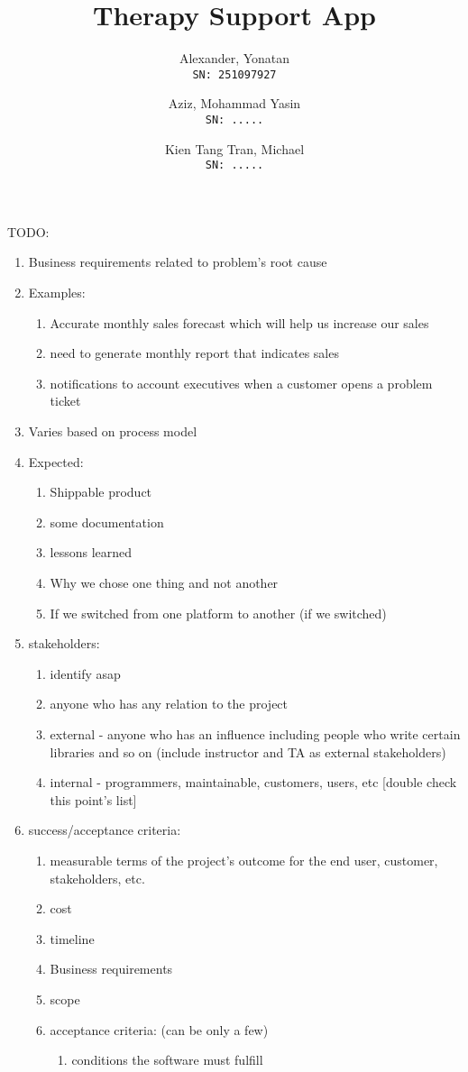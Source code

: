 \documentclass[11pt]{article}
\author{Alexander, Yonatan\\
\texttt{SN: 251097927}
\and
Aziz, Mohammad Yasin\\
\texttt{SN: .....}
\and
Kien Tang Tran, Michael\\
\texttt{SN: .....}
}
\title{Therapy Support App}
\begin{document}
    TODO:

    \begin{enumerate}
        \item Business requirements related to problem's root cause
        \item Examples:
        \begin{enumerate}
            \item Accurate monthly sales forecast which will help us increase our sales
            \item need to generate monthly report that indicates sales
            \item notifications to account executives when a customer opens a problem ticket
        \end{enumerate}
        \item Varies based on process model
        \item Expected:
        \begin{enumerate}
            \item Shippable product
            \item some documentation
            \item lessons learned
            \item Why we chose one thing and not another
            \item If we switched from one platform to another (if we switched)
        \end{enumerate}
        \item stakeholders:
        \begin{enumerate}
            \item identify asap
            \item anyone who has any relation to the project
            \item external - anyone who has an influence\; including people who write certain libraries and so on  (include instructor and TA as external stakeholders)
            \item internal - programmers, maintainable, customers, users, etc [double check this point's list]
        \end{enumerate}
        \item success/acceptance criteria:
        \begin{enumerate}
            \item measurable terms of the project's outcome for the end user, customer, stakeholders, etc.
            \item cost
            \item timeline
            \item Business requirements
            \item scope
            \item acceptance criteria: (can be only a few)
            \begin{enumerate}
                \item conditions the software must fulfill
            \end{enumerate}
        \end{enumerate}
    \end{enumerate}
\end{document}
